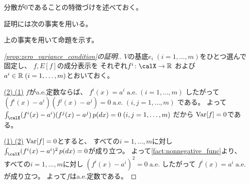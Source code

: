 \documentclass[report]{jlreq}
\begin{document}
分散が0であることの特徴づけを述べておく。


証明には次の事実を用いる。


上の事実を用いて命題を示す。

\begin{proof}[\cref{prop:zero_variance_condition}の証明.]
    $V$の基底$e_i \; (i = 1, \dots, m)$をひとつ選んで固定し、
    $f, E[f]$の成分表示を
    それぞれ$f^i \colon \calX \to \R$
    および
    $a^i \in \mathbb{R} \; (i = 1, \dots, m)$とおいておく。

    \uline{(2) \Rightarrow (1)} \quad
    $f$がa.e.定数ならば、
    $f^i(x) = a^i \;
        \text{a.e.} \;
        (i = 1, \dots, m)$
    したがって
    $(f^i(x) - a^i)(f^j(x) - a^j) = 0 \;
        \text{a.e.} \;
        (i, j = 1, \dots, m)$
    である。
    よって
    $\int_\calX (f^i(x) - a^i)(f^j(x) - a^j) \, p(dx) = 0 \;
        (i, j = 1, \dots, m)$
    だから
    $\operatorname{Var}[f] = 0$である。

    \uline{(1) \Rightarrow (2)} \quad
    $\operatorname{Var}[f] = 0$とすると、
    すべての$i = 1, \dots, m$に対し
    $\int_\calX (f^i(x) - a^i)^2 \, p(dx) = 0$が成り立つ。
    よって\cref{fact:nonnegative_func}より、
    すべての$i = 1, \dots, m$に対し
    $(f^i(x) - a^i)^2 = 0 \;
        \text{a.e.}$
    したがって
    $f^i(x) = a^i \;
        \text{a.e.}$
    が成り立つ。
    よって$f$はa.e.定数である。
\end{proof}
\end{document}
